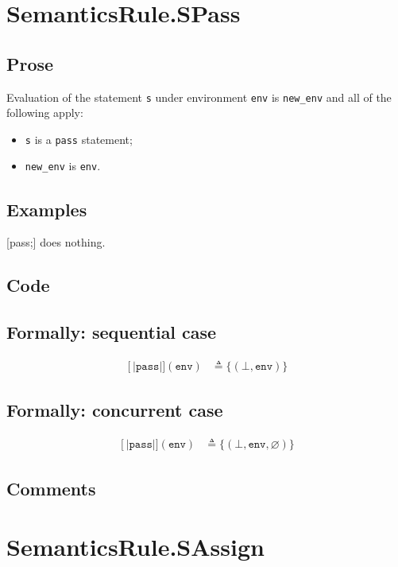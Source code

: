 \documentclass{book}
\newcommand\syntt[1]{\mathtt{#1}}
\newcommand\llbracket{[|}
\newcommand\rrbracket{|]}
\newcommand\interp[1]{\left\llbracket #1 \right\rrbracket}
\begin{document}
\section{SemanticsRule.SPass \label{sec:SemanticsRule.SPass}}

  \subsection{Prose}
  Evaluation of the statement \texttt{s} under environment \texttt{env} is
\texttt{new\_env} and all of the following apply:
  \begin{itemize}
  \item \texttt{s} is a \texttt{pass} statement;
  \item \texttt{new\_env} is \texttt{env}.
  \end{itemize}

  \subsection{Examples}
  [pass;] does nothing.

  \subsection{Code}

  \subsection{Formally: sequential case}
  \begin{align}
  \interp{\syntt{pass}} (\texttt{env}) & \triangleq \{ (\bot, \texttt{env}) \}
  \label{eq:sem-seq-spass}
  \end{align} 

  \subsection{Formally: concurrent case}
  \begin{align}
  \interp{\syntt{pass}} (\texttt{env}) & \triangleq \{ (\bot, \texttt{env}, \varnothing) \}
  \label{eq:sem-conc-spass}
  \end{align} 

  \subsection{Comments}

\section{SemanticsRule.SAssign \label{sec:SemanticsRule.SAssign}}
\end{document}
